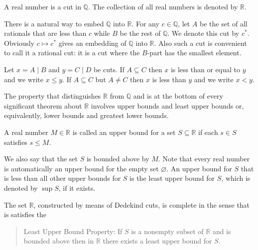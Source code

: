 \begin{defn}
  A \textsf{real number} is a cut in $\mathbb Q$.
  The collection of all real numbers is denoted by $\mathbb R$.
\end{defn}

There is a natural way to embed $\mathbb Q$ into $\mathbb R$.
For any $c \in \mathbb Q$, let $A$ be the set of all rationals that are less than $c$ while $B$ be the rest of $\mathbb Q$.
We denote this cut by $c^*$.
Obviously $c \mapsto c^*$ gives an embedding of $\mathbb Q$ into $\mathbb R$.
Also such a cut is convenient to call it a \textsf{rational cut}: it is a cut where the $B$-part has the smallest element.

\begin{defn}
  Let $x = A \mid B$ and $y = C \mid D$ be cuts.
  If $A \subseteq C$ then $x$ is \textsf{less than or equal to} $y$ and we write $x \leqslant y$.
  If $A \subseteq C$ but $A \neq C$ then $x$ is \textsf{less than} $y$ and we write $x < y$.
\end{defn}

The property that distinguishes $\mathbb R$ from $\mathbb Q$ and is at the bottom of every significant theorem about $\mathbb R$ involves upper bounds and least upper bounds or, equivalently, lower bounds and greatest lower bounds.

\begin{defn}
  A real number $M \in \mathbb R$ is called an \textsf{upper bound} for a set $S \subseteq \mathbb R$ if each $s \in S$ satisfies $s \leqslant M$.
\end{defn}

We also say that the set $S$ is \textsf{bounded above} by $M$.
Note that every real number is automatically an upper bound for the empty set $\varnothing$.
An upper bound for $S$ that is less than all other upper bounds for $S$ is the \textsf{least upper bound} for $S$, which is denoted by $\operatorname{sup} S$, if it exists.

\begin{thm}
  \label{thm:lubp}
  The set $\mathbb R$, constructed by means of Dedekind cuts, is \textsf{complete} in the sense that is satisfies the
  \begin{quote}
    \textsf{Least Upper Bound Property}: If $S$ is a nonempty subset of $\mathbb R$ and is bounded above then in $\mathbb R$ there exists a least upper bound for $S$.
  \end{quote}
\end{thm}

